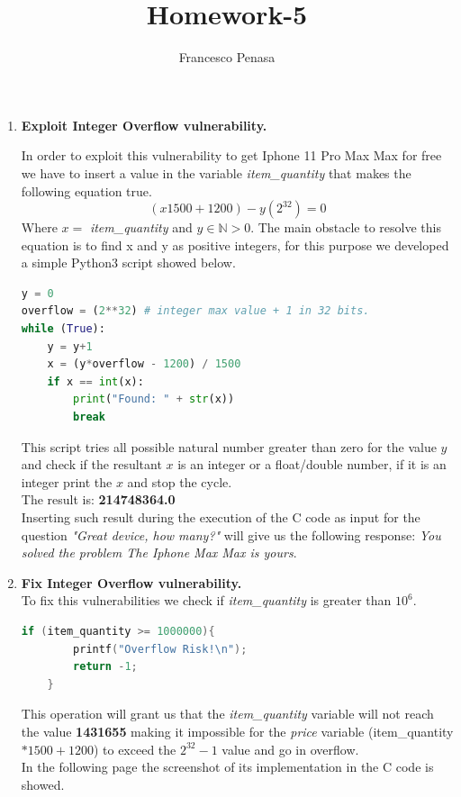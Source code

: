 \documentclass[11pt]{article}
\begin{document}
\author{Francesco Penasa}
\title{Homework-5}
\maketitle

\medskip

\begin{enumerate}

\item
\textbf{Exploit Integer Overflow vulnerability.}

In order to exploit this vulnerability to get Iphone 11 Pro Max Max for free we have to insert a value in the variable \textit{item\_quantity} that makes the following equation true.
\begin{equation}
(x1500 + 1200) - y (2^{32}) = 0
\end{equation}
Where $x = $ \textit{item\_quantity} and $y \in \mathbb{N} > 0$.
The main obstacle to resolve this equation is to find x and y as positive integers, for this purpose we developed a simple Python3 script showed below.
\begin{lstlisting}[language=Python]
y = 0
overflow = (2**32) # integer max value + 1 in 32 bits.
while (True):
    y = y+1
    x = (y*overflow - 1200) / 1500
    if x == int(x):
        print("Found: " + str(x))
        break
\end{lstlisting}



This script tries all possible natural number greater than zero for the value $y$ and check if the resultant $x$ is an integer or a float/double number, if it is an integer print the $x$ and stop the cycle.\\
The result is: \textbf{214748364.0}\\
Inserting such result during the execution of the C code as input for the question \textit{"Great device, how many?"} will give us the following response: 
\textit{You solved the problem 
The Iphone Max Max is yours}.




\item
\textbf{Fix Integer Overflow vulnerability.} \\
To fix this vulnerabilities we check if \textit{item\_quantity} is greater than $10^{6}$.
\begin{lstlisting}[language=C]
if (item_quantity >= 1000000){
        printf("Overflow Risk!\n");
        return -1;
    }
\end{lstlisting}
This operation will grant us that the \textit{item\_quantity} variable will not reach the value 
\textbf{1431655} making it impossible for the \textit{price} variable (item\_quantity $* 1500 + 1200$) to exceed the \textbf{$2^{32}-1$} value and go in overflow.\\
In the following page the screenshot of its implementation in the C code is showed.



\end{enumerate}
\end{document}
